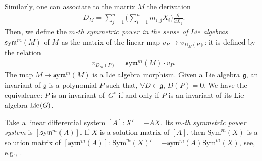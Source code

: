 \documentclass[10pt,a4paper]{amsart}
\numberwithin{equation}{section}
\def\Sym{\mathrm{Sym}}
\def\sym{\mathfrak{s}\mathrm{y}\mathfrak{m}}
\begin{document}
Similarly, one can associate to the matrix $M$ the derivation
\begin{gather*}
D_{M}=\sum_{j=1}^n \bigg(\sum_{i=1}^n m_{i,j} X_{i}\bigg)\frac{\partial}{\partial X_{j}}.
\end{gather*}
Then, we define the \emph{$m$-th symmetric power in the sense of Lie algebras} $\sym^{m}(M)$ of $M$ as the matrix of the linear map $v_{P} \mapsto v_{D_{M}(P)}$: it is defined by the relation
\begin{gather*}
v_{D_{M}(P)}=\sym^{m}(M) \cdot v_{P}.
\end{gather*}
The map $M \mapsto \sym^{m}(M)$ is a Lie algebra morphism.
Given a Lie algebra $\mathfrak{g}$, an invariant of $\mathfrak{g}$ is a polynomial
$P$ such that, $\forall D\in \mathfrak{g}$, $D(P)=0$. We have the equivalence: $P$ is an invariant of~$G^{\circ}$ if and only if $P$ is an invariant of its Lie algebra ${\rm Lie}(G)$.


Take a linear differential system $[A]\colon X' = -A X$. Its \emph{$m$-th symmetric power system}
is $[\sym^m (A)]$. If $X$ is a solution matrix of $[A]$, then $\Sym^m(X)$ is a solution matrix of
$[\sym^m (A)]$: $\Sym^m(X)'=-\sym^m(A)\Sym^m(X)$, see, e.g.,
\cite{ApCoWe13a, PS}.
\end{document}
